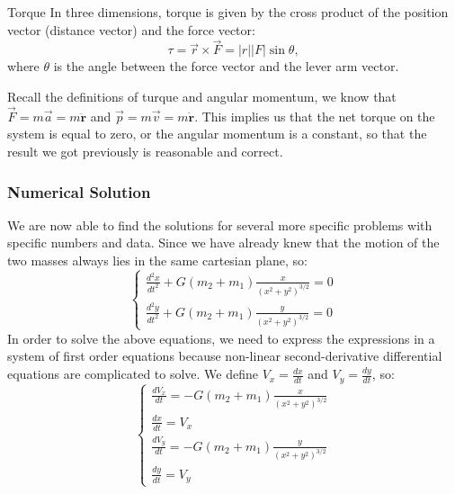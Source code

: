 \begin{Definition}{Torque}{}
    In three dimensions, torque is given by the cross product of the position vector (distance vector) and the force vector:
    \begin{equation}
        \tau = \vec{r} \times \vec{F} = \left|r\right|\left|F\right|\sin{\theta},
    \end{equation}
    where $\theta$ is the angle between the force vector and the lever arm vector.
\end{Definition}

Recall the definitions of turque and angular momentum, we know that $\vec{F} = m\vec{a} = m \ddot{\mathbf{r}}$ and $\vec{p} = m\vec{v} = m \dot{\mathbf{r}}$. This implies us that the net torque on the system is equal to zero, or the angular momentum is a constant, so that the result we got previously is reasonable and correct. 

\subsubsection{Numerical Solution}
We are now able to find the solutions for several more specific problems with specific numbers and data. Since we have already knew that the motion of the two masses always lies in the same cartesian plane, so:
\begin{equation}
    \begin{cases}
        \frac{d^2x}{dt^2} + G(m_{2}+m_{1})\frac{x}{(x^2+y^2)^{3/2}} = 0\\
        \frac{d^2y}{dt^2} + G(m_{2}+m_{1})\frac{y}{(x^2+y^2)^{3/2}} = 0
    \end{cases}
\end{equation}
In order to solve the above equations, we need to express the expressions in a system of first order equations because non-linear second-derivative differential equations are complicated to solve. We define $V_x = \frac{dx}{dt}$ and $V_y = \frac{dy}{dt}$, so:
\begin{equation}
    \begin{cases}
        \frac{dV_x}{dt} = -G(m_{2}+m_{1})\frac{x}{(x^2+y^2)^{3/2}}\\
        \frac{dx}{dt} = V_x\\
        \frac{dV_y}{dt} = -G(m_{2}+m_{1})\frac{y}{(x^2+y^2)^{3/2}}\\
        \frac{dy}{dt} = V_y
    \end{cases}
    \label{system of differential equations two-body}
\end{equation}

